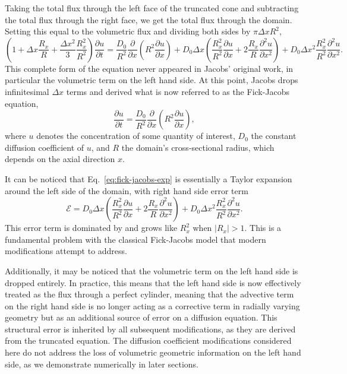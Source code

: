 \documentclass[11pt]{article}
\begin{document}
Taking the total flux through the left face of the truncated cone and subtracting the total flux through the right face, we get the total flux through the domain. Setting this equal to the volumetric flux and dividing both sides by $\pi \Delta x R^2$,
\begin{equation}
    \left( 1 + \Delta x \frac{R_x}{R} + \frac{\Delta x^2}{3} \frac{R_x^2}{R^2} \right) \frac{\partial u}{\partial t} = \frac{D_0}{R^2} \frac{\partial}{\partial x} \left( R^2 \frac{\partial u}{\partial x} \right) + D_0 \Delta x \left( \frac{R_x^2}{R^2} \frac{\partial u}{\partial x} + 2 \frac{R_x}{R} \frac{\partial^2 u}{\partial x^2} \right) + D_0 \Delta x^2 \frac{R_x^2}{R^2} \frac{\partial^2 u}{\partial x^2}. \label{eq:fick-jacobs-exp}
\end{equation}
 This complete form of the equation never appeared in Jacobs' original work, in particular the volumetric term on the left hand side. At this point, Jacobs drops infinitesimal $\Delta x$ terms and derived what is now referred to as the Fick-Jacobs equation,
\begin{equation}
    \frac{\partial u}{\partial t} = \frac{D_0}{R^2} \frac{\partial}{\partial x} \left( R^2 \frac{\partial u}{\partial x} \right), \label{eq:fick-jacobs}
\end{equation}
where $u$ denotes the concentration of some quantity of interest, $D_0$ the constant diffusion coefficient of $u$, and $R$ the domain's cross-sectional radius, which depends on the axial direction $x$. 

It can be noticed that Eq.~\eqref{eq:fick-jacobs-exp} is essentially a Taylor expansion around the left side of the domain, with right hand side error term
\begin{equation}
    \mathcal{E} = D_0 \Delta x \left( \frac{R_x^2}{R^2} \frac{\partial u}{\partial x} + 2 \frac{R_x}{R} \frac{\partial^2 u}{\partial x^2} \right) + D_0 \Delta x^2 \frac{R_x^2}{R^2} \frac{\partial^2 u}{\partial x^2}.
\end{equation}
This error term is dominated by and grows like $R_x^2$ when $|R_x| > 1$. This is a fundamental problem with the classical Fick-Jacobs model that modern modifications attempt to address.

Additionally, it may be noticed that the volumetric term on the left hand side is dropped entirely. In practice, this means that the left hand side is now effectively treated as the flux through a perfect cylinder, meaning that the advective term on the right hand side is no longer acting as a corrective term in radially varying geometry but as an additional source of error on a diffusion equation. This structural error is inherited by all subsequent modifications, as they are derived from the truncated equation. The diffusion coefficient modifications considered here do not address the loss of volumetric geometric information on the left hand side, as we demonstrate numerically in later sections.
\end{document}
